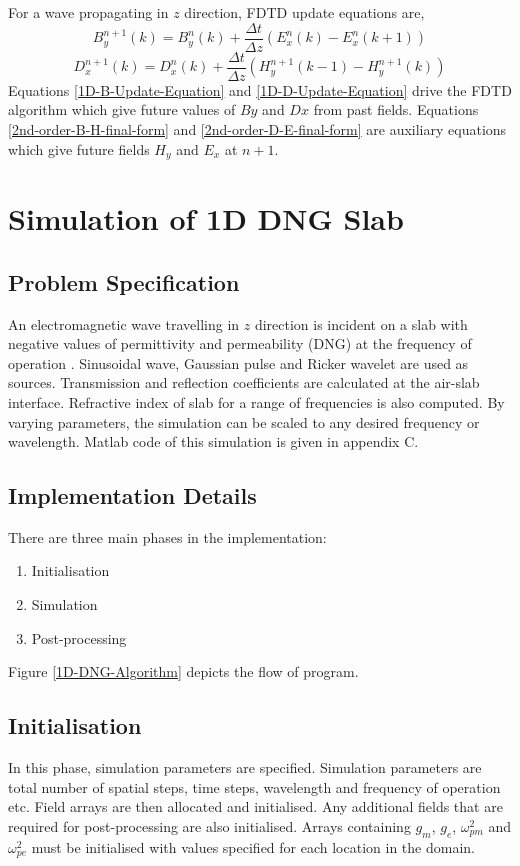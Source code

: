 For a wave propagating in $z$ direction, FDTD update equations are,
\begin{equation}
B^{n+1}_y(k)=B^n_y(k)+\dfrac{\Delta t}{\Delta z}\left(E^n_x(k)-E^n_x(k+1)\right)
\label{1D-B-Update-Equation}
\end{equation}
\begin{equation}
D^{n+1}_x(k)=D^n_x(k)+\dfrac{\Delta t}{\Delta z}\left(H^{n+1}_y(k-1)-H^{n+1}_y(k)\right)
\label{1D-D-Update-Equation}
\end{equation}
Equations \ref{1D-B-Update-Equation} and \ref{1D-D-Update-Equation} drive the FDTD algorithm which give future values of $By$ and $Dx$ from past fields. Equations \ref{2nd-order-B-H-final-form} and \ref{2nd-order-D-E-final-form} are auxiliary equations which give future fields $H_y$ and $E_x$ at $n+1$.
\section{Simulation of 1D DNG Slab}
\subsection{Problem Specification}
An electromagnetic wave travelling in $z$ direction is incident on a slab with negative values of permittivity and permeability (DNG) at the frequency of operation \cite{DNG-Ehud-Ziol}. Sinusoidal wave, Gaussian pulse and Ricker wavelet are used as sources. Transmission and reflection coefficients are calculated at the air-slab interface. Refractive index of slab for a range of frequencies is also computed. By varying parameters, the simulation can be scaled to any desired frequency or wavelength. Matlab code of this simulation is given in appendix C.
\subsection{Implementation Details}
There are three main phases in the implementation:
\begin{enumerate}
\item Initialisation
\item Simulation
\item Post-processing
\end{enumerate}
Figure \ref{1D-DNG-Algorithm} depicts the flow of program.
\subsection{Initialisation}
In this phase, simulation parameters are specified. Simulation parameters are total number of spatial steps, time steps, wavelength and frequency of operation etc. Field arrays are then allocated and initialised. Any additional fields that are required for post-processing are also initialised. Arrays containing $g_m$, $g_e$, $\omega^2_{pm}$ and $\omega^2_{pe}$ must be initialised with values specified for each location in the domain.
